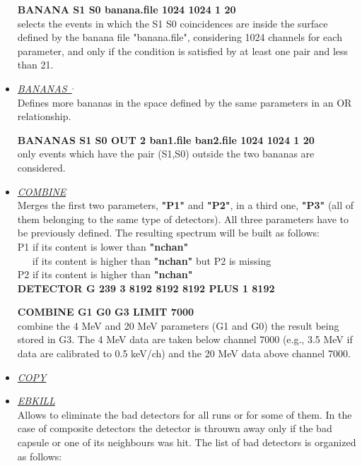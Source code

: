 \begin{itemize}
	\hskip1cm {\bf BANANA S1 S0 banana.file 1024 1024 1 20} \\
	selects the events in which the S1 S0 coincidences are
	inside the surface defined by the banana file "banana.file", 
	considering 1024 channels for each parameter, and only if 
	the condition is satisfied by at least one pair and less 
	than 21.  

 \item	{\it\underline{BANANAS~}}\footnotemark[2]$^,$\footnotemark[3] \\
	Defines more bananas in the space defined by the same parameters in an
	OR relationship.

	\hskip1cm {\bf BANANAS S1 S0 OUT 2 ban1.file ban2.file 1024 1024 1 20}\\
	only events which have the pair (S1,S0) outside the two bananas are
	considered.

 \item	{\it\underline{COMBINE}} \\

	Merges the first two parameters, {\bf "P1"} and {\bf "P2"}, in a third one, 
	{\bf "P3"} (all of them belonging to the same type of detectors). All three 
	parameters have to be previously defined. The resulting spectrum will be built 
	as follows: \\
	\hskip0.5cm P1 if its content is lower than {\bf "nchan"} \\
	\hskip0.5cm ~~~if its content is higher than {\bf "nchan"} but P2 is missing \\
	\hskip0.5cm P2 if its content is higher than {\bf "nchan"} \\

	\hskip1cm{\bf DETECTOR G 239 3 8192 8192 8192 PLUS 1 8192 }

	\hskip1cm{\bf COMBINE G1 G0 G3 LIMIT 7000} \\
	combine the 4 MeV and 20 MeV parameters (G1 and G0) the result being stored in 
	G3. The 4 MeV data are taken below channel 7000 (e.g., 3.5 MeV if data are 
	calibrated to 0.5 keV/ch) and the 20 MeV data above channel 7000.

 \item	{\it\underline{COPY}} \\

 \item	{\it\underline{EBKILL}} \\
        Allows to eliminate the bad detectors for all runs or for some of them.
	In the case of composite detectors the detector is throuwn away only if 
	the bad capsule or one of its neighbours was hit.
	The list of bad detectors is organized as follows:


\end{itemize}
